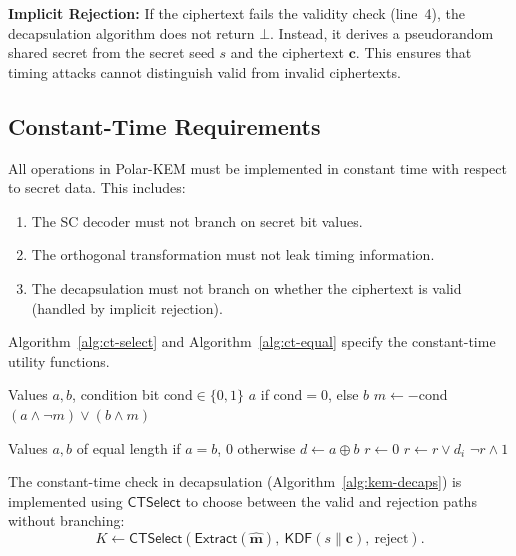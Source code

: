 \documentclass[11pt,a4paper]{article}
\newcommand{\polarKem}{\textsf{Polar-KEM}\xspace}
\newcommand{\KDF}{\textsf{KDF}\xspace}
\newcommand{\Extract}{\textsf{Extract}\xspace}
\newcommand{\CTSelect}{\textsf{CTSelect}\xspace}
\newcommand{\CTEqual}{\textsf{CTEqual}\xspace}
\begin{document}
\textbf{Implicit Rejection:} If the ciphertext fails the validity check (line~4), the decapsulation algorithm does not return $\bot$. Instead, it derives a pseudorandom shared secret from the secret seed $s$ and the ciphertext $\mathbf{c}$. This ensures that timing attacks cannot distinguish valid from invalid ciphertexts.

\subsection{Constant-Time Requirements}\label{sec:constant-time}

All operations in \polarKem must be implemented in constant time with respect to secret data. This includes:

\begin{enumerate}[leftmargin=2em]
\item The SC decoder must not branch on secret bit values.
\item The orthogonal transformation must not leak timing information.
\item The decapsulation must not branch on whether the ciphertext is valid (handled by implicit rejection).
\end{enumerate}

Algorithm~\ref{alg:ct-select} and Algorithm~\ref{alg:ct-equal} specify the constant-time utility functions.

\begin{algorithm}[H]
\caption{$\CTSelect(a, b, \text{cond})$}
\label{alg:ct-select}
\begin{algorithmic}[1]
\REQUIRE Values $a, b$, condition bit $\text{cond} \in \{0, 1\}$
\ENSURE $a$ if $\text{cond} = 0$, else $b$
\STATE $m \gets -\text{cond}$ 
\RETURN $(a \wedge \neg m) \vee (b \wedge m)$
\end{algorithmic}
\end{algorithm}

\begin{algorithm}[H]
\caption{$\CTEqual(a, b)$}
\label{alg:ct-equal}
\begin{algorithmic}[1]
\REQUIRE Values $a, b$ of equal length
 if $a = b$, 0 otherwise
\STATE $d \gets a \oplus b$
\STATE $r \gets 0$
    \STATE $r \gets r \vee d_i$
\ENDFOR
\RETURN $\neg r \wedge 1$
\end{algorithmic}
\end{algorithm}

The constant-time check in decapsulation (Algorithm~\ref{alg:kem-decaps}) is implemented using $\CTSelect$ to choose between the valid and rejection paths without branching:
\[
K \gets \CTSelect(\Extract(\widehat{\mathbf{m}}),\ \KDF(s \| \mathbf{c}),\ \text{reject}).
\]
\end{document}
